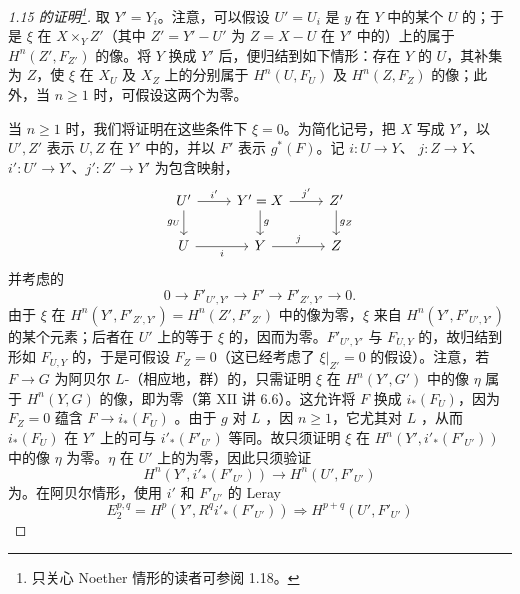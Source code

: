 \begin{proof}[1.15 的证明\footnote{只关心 Noether 情形的读者可参阅 1.18。}]
取 $Y'=Y_i$。注意，可以假设 $U'=U_i$ 是 $y$ 在 $Y$ 中的某个 $U$ 的；于是 $\xi$ 在 $X\times_Y Z'$（其中 $Z'=Y'-U'$ 为 $Z=X-U$ 在 $Y'$ 中的）上的属于 $H^n(Z',F_{Z'})$ 的像。将 $Y$ 换成 $Y'$ 后，便归结到如下情形：存在 $Y$ 的 $U$，其补集为 $Z$，使 $\xi$ 在 $X_U$ 及 $X_Z$ 上的分别属于 $H^n(U,F_U)$ 及 $H^n(Z,F_Z)$ 的像；此外，当 $n\geq1$ 时，可假设这两个为零。

当 $n\geq1$ 时，我们将证明在这些条件下 $\xi=0$。为简化记号，把 $X$ 写成 $Y'$，以 $U',Z'$ 表示 $U,Z$ 在 $Y'$ 中的，并以 $F'$ 表示 $g^*(F)$。记 $i:U\to Y$、
$j:Z\to Y$、$i':U'\to Y'$、$j':Z'\to Y'$ 为包含映射，
\[
\begin{tikzcd}
U'\arrow[r,"i'"]\arrow[d,"g_U"']&Y'=X\arrow[r,"j'"]\arrow[d,"g"]&Z'\arrow[d,"g_Z"]\\
U\arrow[r,"i"']&Y\arrow[r,"j"]&Z
\end{tikzcd}
\]
并考虑的
\[0\longrightarrow F'_{U',Y'}\longrightarrow F'\longrightarrow F'_{Z',Y'}\longrightarrow0.\]
由于 $\xi$ 在 $H^n(Y',F'_{Z',Y'})=H^n(Z',F'_{Z'})$ 中的像为零，$\xi$ 来自 $H^n(Y',F'_{U',Y'})$ 的某个元素；后者在 $U'$ 上的等于 $\xi$ 的，因而为零。$F'_{U',Y'}$ 与 $F_{U,Y}$ 的，故归结到形如 $F_{U,Y}$ 的，于是可假设 $F_Z=0$（这已经考虑了 $\xi|_{Z'}=0$ 的假设）。注意，若 $F\to G$ 为阿贝尔 $L$-（相应地，群）的，只需证明 $\xi$ 在 $H^n(Y',G')$ 中的像 $\eta$ 属于 $H^n(Y,G)$ 的像，即为零（第 XII 讲 6.6）。这允许将 $F$ 换成 $i_*(F_U)$，因为 $F_Z=0$ 蕴含 $F\to i_*(F_U)$ 。由于 $g$ 对 $L$ ，因 $n\geq1$，它尤其对 $L$ ，从而 $i_*(F_U)$ 在 $Y'$ 上的可与 $i'_*(F'_{U'})$ 等同。故只须证明 $\xi$ 在 $H^n(Y',i'_*(F'_{U'}))$ 中的像 $\eta$ 为零。$\eta$ 在 $U'$ 上的为零，因此只须验证
\[H^n(Y',i'_*(F'_{U'}))\longrightarrow H^n(U',F'_{U'})\tag{*}\]
为。在阿贝尔情形，使用 $i'$ 和 $F'_{U'}$ 的 Leray 
\[E_2^{p,q}=H^p(Y',R^qi'_*(F'_{U'}))\Longrightarrow H^{p+q}(U',F'_{U'})\]

\end{proof}
